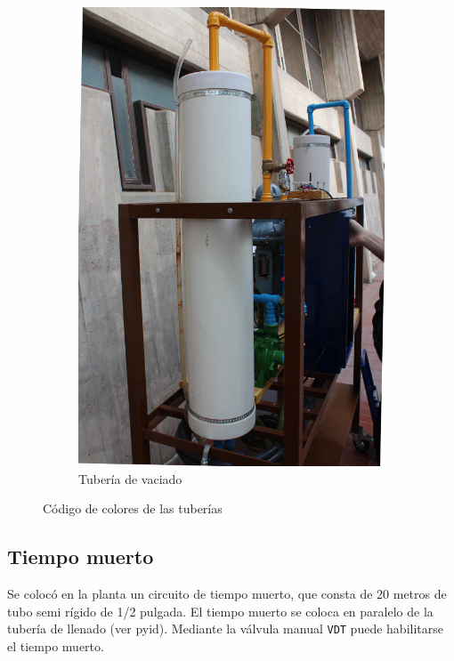 \begin{figure}[t]
\begin{subfigure}[b]{0.40\textwidth}
\includegraphics[width=\textwidth]{Cap2-DisenoEnsamblado/images/caneria2.JPG}
	\caption{Tubería de vaciado}
        \end{subfigure}
        \caption{Código de colores de las tuberías}
        \label{fig:canerias}
\end{figure}

\subsection{Tiempo muerto}
\label{subsec:tiempoMuerto}
Se colocó en la planta un circuito de tiempo muerto, que consta de 20 metros de
tubo semi rígido de 1/2 pulgada.
El tiempo muerto se coloca en paralelo de la tubería de llenado (ver
\gls{pyid}).
Mediante la válvula manual \verb|VDT| puede habilitarse el tiempo muerto.

